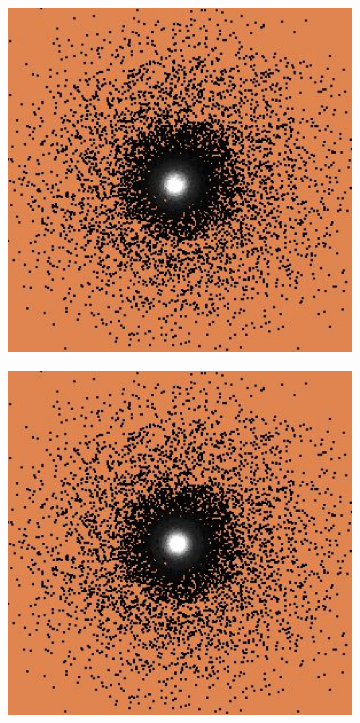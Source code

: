 \documentclass [MS] {UCLAthesis}
\begin{document}
\begin{figure}
\begin{subfigure}[b]{0.20\textwidth}
        \caption{}
    \end{subfigure}
    \hfill
    \centering
    \begin{subfigure}[b]{0.20\textwidth}
        \centering
        \includegraphics[width=\textwidth]{fixation4}
        \caption{}
    \end{subfigure}
    \hfill
    \centering
    \begin{subfigure}[b]{0.20\textwidth}
        \centering
        \includegraphics[width=\textwidth]{fixation5}

\end{subfigure}
\end{figure}
\end{document}
